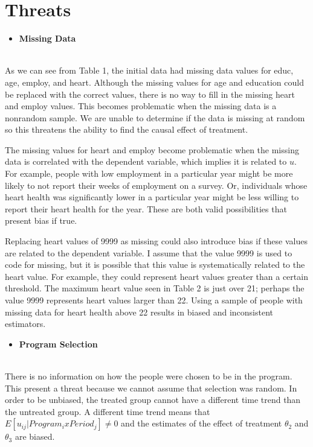 \documentclass[a4paper]{article}
\begin{document}
\section{Threats}

\begin{itemize}
\item \textbf{Missing Data}
\end{itemize}
\\
As we can see from Table 1, the initial data had missing data values for educ, age, employ, and heart. Although the missing values for age and education could be replaced with the correct values, there is no way to fill in the missing heart and employ values. This becomes problematic when the missing data is a nonrandom sample. We are unable to determine if the data is missing at random so this threatens the ability to find the causal effect of treatment. 

The missing values for heart and employ become problematic when the missing data is correlated with the dependent variable, which implies it is related to $u$. For example, people with low employment in a particular year might be more likely to not report their weeks of employment on a survey. Or, individuals whose heart health was significantly lower in a particular year might be less willing to report their heart health for the year. These are both valid possibilities that present bias if true.

Replacing heart values of 9999 as missing could also introduce bias if these values are related to the dependent variable. I assume that the value 9999 is used to code for missing, but it is possible that this value is systematically related to the heart value. For example, they could represent heart values greater than a certain threshold. The maximum heart value seen in Table 2 is just over 21; perhaps the value 9999 represents heart values larger than 22. Using a sample of people with missing data for heart health above 22 results in biased and inconsistent estimators. 

\begin{itemize}
\item \textbf{Program Selection}
\end{itemize}
\\
There is no information on how the people were chosen to be in the program. This present a threat because we cannot assume that selection was random. In order to be unbiased, the treated group cannot have a different time trend than the untreated group. A different time trend means that $E[u_{ij}|Program_i x Period_j] \ne 0$ and the estimates of the effect of treatment $\theta_2$ and $\theta_3$ are biased. 
\end{document}
